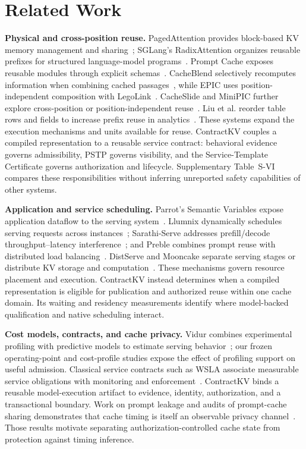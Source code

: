 \section{Related Work}
\label{sec:related}

\noindent\textbf{Physical and cross-position reuse.}
PagedAttention provides block-based KV memory management and sharing~\cite{vllm2023}; SGLang's RadixAttention organizes reusable prefixes for structured language-model programs~\cite{sglang2024}. Prompt Cache exposes reusable modules through explicit schemas~\cite{promptcache2024}. CacheBlend selectively recomputes information when combining cached passages~\cite{cacheblend2025}, while EPIC uses position-independent composition with LegoLink~\cite{epic2025}. CacheSlide and MiniPIC further explore cross-position or position-independent reuse~\cite{cacheslide2026,minipic2026}. Liu et al. reorder table rows and fields to increase prefix reuse in analytics~\cite{llmqueries2025}. These systems expand the execution mechanisms and units available for reuse. ContractKV couples a compiled representation to a reusable service contract: behavioral evidence governs admissibility, PSTP governs visibility, and the Service-Template Certificate governs authorization and lifecycle. Supplementary Table~S-VI compares these responsibilities without inferring unreported safety capabilities of other systems.

\noindent\textbf{Application and service scheduling.}
Parrot's Semantic Variables expose application dataflow to the serving system~\cite{parrot2024}. Llumnix dynamically schedules serving requests across instances~\cite{llumnix2024}; Sarathi-Serve addresses prefill/decode throughput--latency interference~\cite{sarathi2024}; and Preble combines prompt reuse with distributed load balancing~\cite{preble2025}. DistServe and Mooncake separate serving stages or distribute KV storage and computation~\cite{distserve2024,mooncake2025}. These mechanisms govern resource placement and execution. ContractKV instead determines when a compiled representation is eligible for publication and authorized reuse within one cache domain. Its waiting and residency measurements identify where model-backed qualification and native scheduling interact.

\noindent\textbf{Cost models, contracts, and cache privacy.}
Vidur combines experimental profiling with predictive models to estimate serving behavior~\cite{vidur2024}; our frozen operating-point and cost-profile studies expose the effect of profiling support on useful admission. Classical service contracts such as WSLA associate measurable service obligations with monitoring and enforcement~\cite{wsla2003}. ContractKV binds a reusable model-execution artifact to evidence, identity, authorization, and a transactional boundary. Work on prompt leakage and audits of prompt-cache sharing demonstrates that cache timing is itself an observable privacy channel~\cite{iknow2025,auditing2025}. Those results motivate separating authorization-controlled cache state from protection against timing inference.

